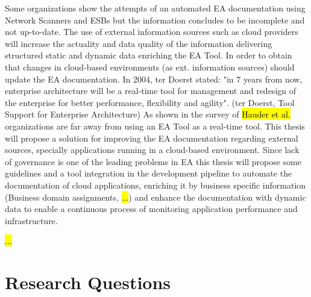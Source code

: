 Some organizations show the attempts of an automated EA documentation using Network Scanners and ESBs but the information concludes to be incomplete and not up-to-date. 
The use of external information sources such as cloud providers will increase the actuality and data quality of the information delivering structured static and dynamic data enriching the EA Tool. In order to obtain that changes in cloud-based environments (as ext. information sources) should update the EA documentation.
In 2004, ter Doerst stated: "in 7 years from now, enterprise architecture will be a real-time tool for management and redesign of the enterprise for better performance, flexibility and agility". (ter Doerst, Tool Support for Enterprise Architecture)
As shown in the survey of \hl{Hauder et al.} organizations are far away from using an EA Tool as a real-time tool. This thesis will propose a solution for improving the EA documentation regarding external sources, specially applications running in a cloud-based environment. Since lack of governance is one of the leading problems in EA this thesis will propose some guidelines %
and a tool integration in the development pipeline to automate the documentation of cloud applications, enriching it by business specific information (Business domain assignments, \hl{...}) and enhance the documentation with dynamic data to enable a continuous process of monitoring application performance and infrastructure.

\hl{ ... }

\section{Research Questions}\label{section:researchquestions}


